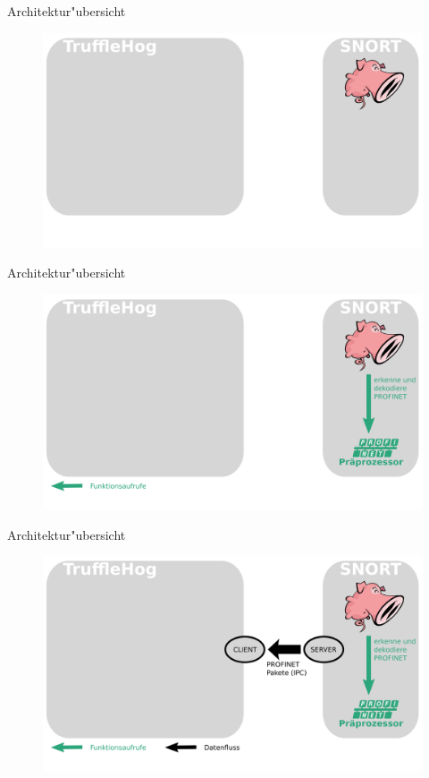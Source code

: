 \begin{frame}{Architektur"ubersicht}
	\begin{figure}
		\centering
		\includegraphics[width=\textwidth]{./images/jan_2.png}
	\end{figure}
\end{frame}

\begin{frame}{Architektur"ubersicht}
	\begin{figure}
		\centering
		\includegraphics[width=\textwidth]{./images/jan_4.png}
	\end{figure}
\end{frame}

\begin{frame}{Architektur"ubersicht}
	\begin{figure}
		\centering
		\includegraphics[width=\textwidth]{./images/jan_6.png}
	\end{figure}
\end{frame}

